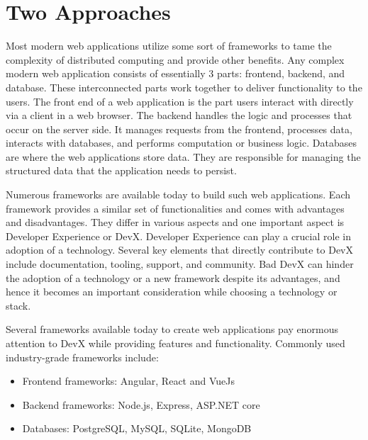 
\chapter{Two Approaches}
\label{chap:section_one}

Most modern web applications utilize some sort of frameworks to tame the complexity of distributed computing and provide other benefits. Any complex modern web application consists of essentially 3 parts: frontend, backend, and database. These interconnected parts work together to deliver functionality to the users. The front end of a web application is the part users interact with directly via a client in a web browser. The backend handles the logic and processes that occur on the server side. It manages requests from the frontend, processes data, interacts with databases, and performs computation or business logic. Databases are where the web applications store data. They are responsible for managing the structured data that the application needs to persist.

Numerous frameworks are available today to build such web applications. Each framework provides a similar set of functionalities and comes with advantages and disadvantages. They differ in various aspects and one  important aspect is Developer Experience or DevX\cite{swimm}. Developer Experience can play a crucial role in adoption of a technology. Several key elements that directly contribute to DevX include documentation, tooling, support, and community. Bad DevX can hinder the adoption of a technology or a new framework despite its advantages, and hence it becomes an important consideration while choosing a technology or stack.

Several frameworks available today to create web applications pay enormous attention to DevX while providing features and functionality. Commonly used industry-grade frameworks include\cite{stackoverflow}:

\begin{itemize}
    \item Frontend frameworks: Angular, React\cite{react} and VueJs
    \item Backend frameworks: Node.js, Express\cite{express}, ASP.NET core
    \item Databases: PostgreSQL, MySQL, SQLite, MongoDB
\end{itemize}

